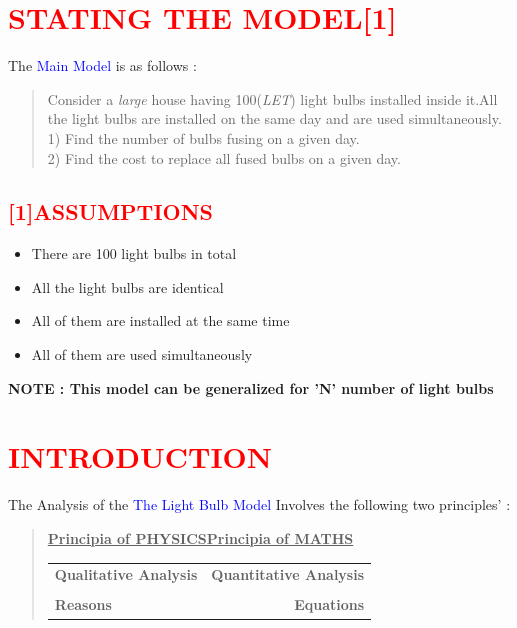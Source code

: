 \documentclass[a4paper]{article}
\begin{document}
\section{\huge{\textcolor{red}{STATING THE MODEL[1]}}}
\Large{The \textcolor{blue}{Main Model} is as follows :}
\begin{quote}
\Large{Consider a \textit{large} house having 100(\textit{LET}) light bulbs installed inside it.All the light bulbs are installed on the same day and are used simultaneously.\\
1) Find the number of bulbs fusing on a given day.\\
2) Find the cost to replace all fused bulbs on a given day.
\vspace{2 cm}
}
\end{quote}
\subsection{\huge{\textcolor{red}{[1]ASSUMPTIONS}}}
\begin{itemize}
\item \Large{There are 100 light bulbs in total}
\item \Large{All the light bulbs are identical}
\item \Large{All of them are installed at the same time}
\item \Large{All of them are used simultaneously}
\end{itemize}
\vspace*{\fill}
\large{\textbf{NOTE : This model can be generalized for 'N' number of light bulbs}
}
\newpage
\section{\huge{\textcolor{red}{INTRODUCTION}}}
\Large{The Analysis of the \textcolor{blue}{The Light Bulb Model}} Involves the following two principles' : 
\begin{quote}
\begin{center}
\vspace{2cm}
\Large{\textbf{\underline{Principia of PHYSICS}\hspace{1.6 cm}\underline{Principia of MATHS}}}\\
\vspace{2cm}
\begin{tabular}{l||r}
\textbf{Qualitative Analysis} &\textbf{Quantitative Analysis}  \\\\
\textbf{Reasons}&\textbf{Equations}
\end{tabular}
\end{center}
\end{quote}
\vspace{2 cm}
\end{document}
